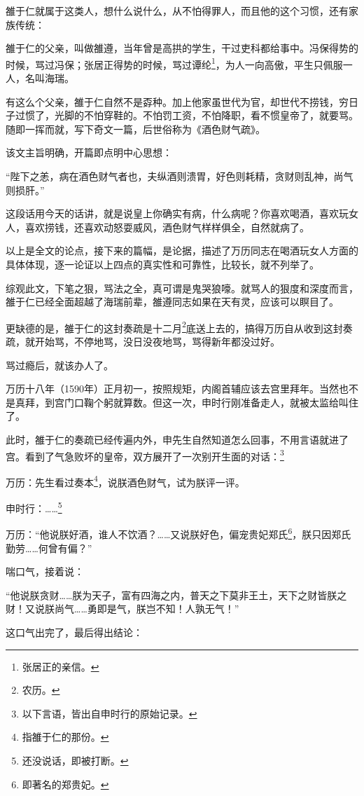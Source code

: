 \begin{multicols}{\theparacolNo}
雒于仁就属于这类人，想什么说什么，从不怕得罪人，而且他的这个习惯，还有家族传统：

雒于仁的父亲，叫做雒遵，当年曾是高拱的学生，干过吏科都给事中。冯保得势的时候，骂过冯保；张居正得势的时候，骂过谭纶\footnote{张居正的亲信。}，为人一向高傲，平生只佩服一人，名叫海瑞。

有这么个父亲，雒于仁自然不是孬种。加上他家虽世代为官，却世代不捞钱，穷日子过惯了，光脚的不怕穿鞋的。不怕罚工资，不怕降职，看不惯皇帝了，就要骂。随即一挥而就，写下奇文一篇，后世俗称为《酒色财气疏》。

该文主旨明确，开篇即点明中心思想：

“陛下之恙，病在酒色财气者也，夫纵酒则溃胃，好色则耗精，贪财则乱神，尚气则损肝。”

这段话用今天的话讲，就是说皇上你确实有病，什么病呢？你喜欢喝酒，喜欢玩女人，喜欢捞钱，还喜欢动怒耍威风，酒色财气样样俱全，自然就病了。

以上是全文的论点，接下来的篇幅，是论据，描述了万历同志在喝酒玩女人方面的具体体现，逐一论证以上四点的真实性和可靠性，比较长，就不列举了。

综观此文，下笔之狠，骂法之全，真可谓是鬼哭狼嚎。就骂人的狠度和深度而言，雒于仁已经全面超越了海瑞前辈，雒遵同志如果在天有灵，应该可以瞑目了。

更缺德的是，雒于仁的这封奏疏是十二月\footnote{农历。}底送上去的，搞得万历自从收到这封奏疏，就开始骂，不停地骂，没日没夜地骂，骂得新年都没过好。

骂过瘾后，就该办人了。

万历十八年（1590年）正月初一，按照规矩，内阁首辅应该去宫里拜年。当然也不是真拜，到宫门口鞠个躬就算数。但这一次，申时行刚准备走人，就被太监给叫住了。

此时，雒于仁的奏疏已经传遍内外，申先生自然知道怎么回事，不用言语就进了宫。看到了气急败坏的皇帝，双方展开了一次别开生面的对话：\footnote{以下言语，皆出自申时行的原始记录。}

万历：先生看过奏本\footnote{指雒于仁的那份。}，说朕酒色财气，试为朕评一评。

申时行：……\footnote{还没说话，即被打断。}

万历：“他说朕好酒，谁人不饮酒？……又说朕好色，偏宠贵妃郑氏\footnote{即著名的郑贵妃。}，朕只因郑氏勤劳……何曾有偏？”

喘口气，接着说：

“他说朕贪财……朕为天子，富有四海之内，普天之下莫非王土，天下之财皆朕之财！又说朕尚气……勇即是气，朕岂不知！人孰无气！”

这口气出完了，最后得出结论：


\end{multicols}
